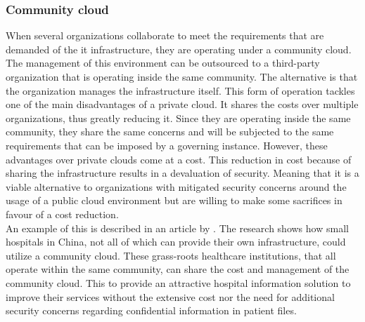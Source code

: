 \subsubsection{Community cloud}
When several organizations collaborate to meet the requirements that are demanded of the \acrshort{it} infrastructure, they are operating under a community cloud. 
The management of this environment can be outsourced to a third-party organization that is operating inside the same community.
The alternative is that the organization manages the infrastructure itself.
This form of operation tackles one of the main disadvantages of a private cloud.
It shares the costs over multiple organizations, thus greatly reducing it. 
Since they are operating inside the same community, they share the same concerns and will be subjected to the same requirements that can be imposed by a governing instance. 
However, these advantages over private clouds come at a cost. 
This reduction in cost because of sharing the infrastructure results in a devaluation of security. 
Meaning that it is a viable alternative to organizations with mitigated security concerns around the usage of a public cloud environment but are willing to make some sacrifices in favour of a cost reduction. 
\\
An example of this is described in an article by \textcite{Yao2014}. 
The research shows how small hospitals in China, not all of which can provide their own infrastructure, could utilize a community cloud. 
These grass-roots healthcare institutions, that all operate within the same community, can share the cost and management of the community cloud. 
This to provide an attractive hospital information solution to improve their services without the extensive cost nor the need for additional security concerns regarding confidential information in patient files.

